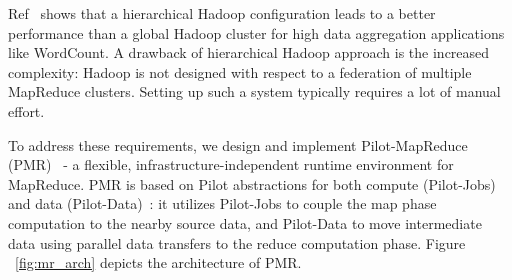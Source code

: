 \documentclass[]{paper}
\begin{document}
Ref~\cite{weissman-mr-11} shows that a hierarchical Hadoop configuration leads to a better performance than a global Hadoop cluster for high data aggregation applications like WordCount. %
A drawback of hierarchical Hadoop approach is the increased complexity: Hadoop is not designed with respect to a federation of multiple MapReduce clusters. Setting up such a system typically requires a lot of manual effort.

To address these requirements, we design and implement Pilot-MapReduce (PMR)~\cite{pmr-2012} - a flexible, infrastructure-independent runtime environment for MapReduce. PMR is based on Pilot abstractions for both compute (Pilot-Jobs) and data (Pilot-Data)~\cite{pstar-2012}: it utilizes Pilot-Jobs to couple the map phase computation to the nearby source data, and Pilot-Data to move intermediate data using parallel data transfers to the reduce computation phase. Figure ~\ref{fig:mr_arch} depicts the architecture of PMR. 
\end{document}

